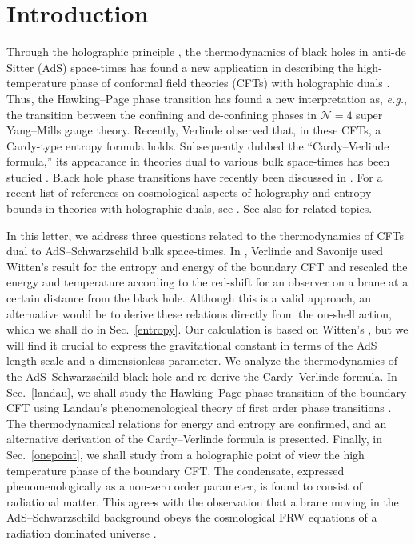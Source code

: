 \documentclass[a4paper,12pt]{article}
\begin{document}
\section{Introduction}
Through the holographic principle \cite{tHooft93,Susskind95}, the
thermodynamics of black holes in anti-de Sitter (AdS) space-times
\cite{Hawking83,Brown94} has found a new application in describing the
high-temperature phase of conformal field theories (CFTs) with holographic
duals \cite{Witten98-2}. Thus, the Hawking--Page phase transition has found
a new interpretation as, \emph{e.g.}, the transition between the confining
and de-confining phases in $\mathcal{N}=4$ super Yang--Mills gauge theory.
Recently, Verlinde \cite{Verlinde00} observed that, in these CFTs, a
Cardy-type entropy formula \cite{Cardy86} holds. Subsequently dubbed the
``Cardy--Verlinde formula,'' its appearance in theories dual to various
bulk space-times has been studied
\cite{Lin00,Nojiri00,Cai01a,Biswas01,Nojiri01a,
Birmingham01,Klemm01b,Youm01a,Nojiri01b,Youm01b,Nojiri01c,Cai01c,Youm01c,Wang01b}.
Black hole phase transitions have recently been discussed in
\cite{Surya01,Stephens01,Creminelli01}.  For a recent list of references on
cosmological aspects of holography and entropy bounds in theories with
holographic duals, see \cite{Youm01c}. See also
\cite{Shiromizu01a,Shiromizu01b} for related topics.

In this letter, we address three questions related to the
thermodynamics of CFTs dual to AdS--Schwarzschild bulk space-times. In
\cite{Verlinde00,Savonije01}, Verlinde and Savonije used Witten's
result \cite{Witten98-2} for the entropy and energy of the boundary
CFT and rescaled the energy and temperature according to the red-shift for
an observer on a brane at a certain distance from the black hole. Although this
is a valid approach, an alternative would be to derive these relations
directly from the on-shell action, which we shall do in Sec.\
\ref{entropy}. Our calculation is based on Witten's \cite{Witten98-2},
but we will find it crucial to express the gravitational
constant in terms of the AdS length scale and a dimensionless
parameter. We analyze the thermodynamics of the AdS--Schwarzschild
black hole and re-derive the Cardy--Verlinde formula.
In Sec.\ \ref{landau}, we shall study the Hawking--Page
phase transition of the boundary CFT using Landau's phenomenological
theory of first order phase transitions \cite{Landau9}. The
thermodynamical relations for energy and entropy are confirmed, and an
alternative derivation of the Cardy--Verlinde formula is presented.
Finally, in Sec.\ \ref{onepoint}, we shall study from a
holographic point of view the high temperature phase of the boundary
CFT. The condensate, expressed phenomenologically as a non-zero order
parameter, is found to consist of radiational matter. This agrees with the
observation that a brane moving in the AdS--Schwarzschild background
obeys the cosmological FRW equations of a radiation dominated
universe \cite{Gubser99}.
\end{document}
